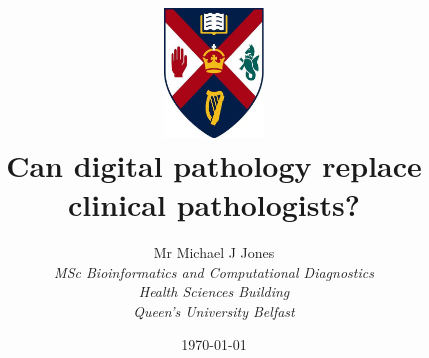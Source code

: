 \documentclass[12pt]{article}
\begin{document}
\title{ \includegraphics[natwidth=389,natheight=500,width=0.2\textwidth]{./shield.jpeg} \\ Can digital pathology replace clinical pathologists?} %

\author{
        Mr Michael J Jones \\
                \em{MSc Bioinformatics and Computational Diagnostics}\\
       	Health Sciences Building\\
        Queen's University Belfast
}
\date{\today}

\maketitle
\end{document}
